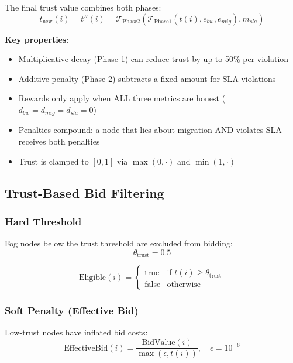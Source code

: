 \documentclass[12pt,a4paper]{article}
\begin{document}
The final trust value combines both phases:
\begin{equation}
    t_{\text{new}}(i) = t''(i) = \mathcal{T}_{\text{Phase2}}(\mathcal{T}_{\text{Phase1}}(t(i), e_{bw}, e_{mig}), m_{sla})
\end{equation}

\textbf{Key properties}:
\begin{itemize}
    \item Multiplicative decay (Phase 1) can reduce trust by up to 50\% per violation
    \item Additive penalty (Phase 2) subtracts a fixed amount for SLA violations
    \item Rewards only apply when ALL three metrics are honest ($d_{bw} = d_{mig} = d_{sla} = 0$)
    \item Penalties compound: a node that lies about migration AND violates SLA receives both penalties
    \item Trust is clamped to $[0, 1]$ via $\max(0, \cdot)$ and $\min(1, \cdot)$
\end{itemize}

\subsection{Trust-Based Bid Filtering}

\subsubsection{Hard Threshold}

Fog nodes below the trust threshold are excluded from bidding:
\begin{equation}
    \theta_{\text{trust}} = 0.5
\end{equation}

\begin{equation}
    \text{Eligible}(i) = \begin{cases}
        \text{true} & \text{if } t(i) \geq \theta_{\text{trust}} \\
        \text{false} & \text{otherwise}
    \end{cases}
\end{equation}

\subsubsection{Soft Penalty (Effective Bid)}

Low-trust nodes have inflated bid costs:
\begin{equation}
    \text{EffectiveBid}(i) = \frac{\text{BidValue}(i)}{\max(\epsilon, t(i))}, \quad \epsilon = 10^{-6}
\end{equation}
\end{document}
